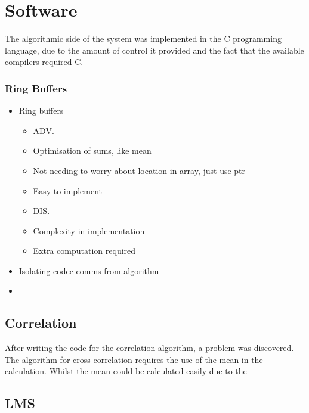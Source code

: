 \section{Software}
The algorithmic side of the system was implemented in the C programming language, due to the amount of control it provided and the fact that the available compilers required C.

\subsubsection{Ring Buffers}

\begin{itemize}
\item Ring buffers
	\begin{itemize}
	\item ADV.
	\item Optimisation of sums, like mean
	\item Not needing to worry about location in array, just use ptr
	\item Easy to implement
	\item DIS.
	\item Complexity in implementation
	\item Extra computation required
	\end{itemize}
\item Isolating codec comms from algorithm
\item 
\end{itemize}

\subsection{Correlation}

After writing the code for the correlation algorithm, a problem was discovered.
The algorithm for cross-correlation requires the use of the mean in the calculation.
Whilst the mean could be calculated easily due to the 

\subsection{LMS}

